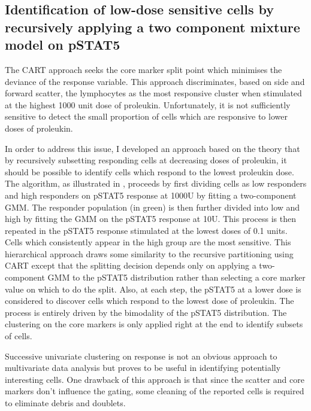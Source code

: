\subsection{Identification of low-dose sensitive cells by recursively applying a two component mixture model on pSTAT5}

The CART approach seeks the core marker split point which minimises the deviance of the response variable.
This approach discriminates, based on side and forward scatter, the lymphocytes as the most responsive cluster
when stimulated at the highest 1000 unit dose of proleukin.
Unfortunately, it is not sufficiently sensitive to detect the small proportion of cells which are responsive to lower doses of proleukin.

In order to address this issue, I developed an approach based on the theory that by recursively subsetting responding cells at decreasing doses of proleukin,
it should be possible to identify cells which respond to the lowest proleukin dose.
The algorithm, as illustrated in , proceeds by first dividing cells as low responders and high responders on pSTAT5 response at 1000U 
by fitting a two-component \gls{GMM}.
The responder population (in green) is then further divided into low and high by fitting the \gls{GMM} on the pSTAT5 response at 10U.
This process is then repeated in the pSTAT5 response stimulated at the lowest doses of 0.1 units.
Cells which consistently appear in the high group are the most sensitive.
This hierarchical approach draws some similarity to the recursive partitioning using \gls{CART} except that the splitting decision depends only
on applying a two-component \gls{GMM} to the pSTAT5 distribution rather than selecting a core marker value on which to do the split.
Also, at each step, the pSTAT5 at a lower dose is considered to discover cells which respond to the lowest dose of proleukin.
The process is entirely driven by the bimodality of the pSTAT5 distribution.
The clustering on the core markers is only applied right at the end to identify subsets of cells.




Successive univariate clustering on response is not an obvious approach to multivariate data analysis but proves to be useful in identifying potentially interesting cells.
One drawback of this approach is that since the scatter and core markers don't influence the gating, some cleaning of the reported cells is required to eliminate
debris and doublets.

